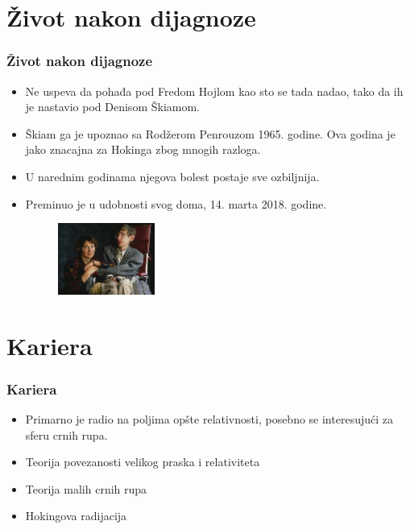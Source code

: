 \documentclass{beamer}
\begin{document}
\section{Život nakon dijagnoze}

\begin{frame}[fragile]\frametitle{Život nakon dijagnoze}
	\begin{itemize} \fontsize{9}{6}\selectfont	
		\item  Ne uspeva da pohađa pod Fredom Hojlom kao sto se tada nadao, tako da ih je nastavio pod Denisom Škiamom. 
            \item Škiam ga je upoznao sa Rodžerom Penrouzom 1965. godine. Ova godina je jako znacajna za Hokinga zbog mnogih razloga.
		\item  U narednim godinama njegova bolest postaje sve ozbiljnija.
		\item  Preminuo je u udobnosti svog doma, 14. marta 2018. godine.
\begin{figure}[h!] 
\begin{center}
\includegraphics[width=0.3\textwidth]{StivenHoking.jpeg}
\end{center} 
 \captionsetup{font=small}{Slika2: Stiven Hoking i njegova žena} 
\label{fig:StivenHoking}
\end{figure}
\end{itemize}
\end{frame}


\section{Kariera}

\begin{frame}[fragile]\frametitle{Kariera}
\begin{itemize}	 \fontsize{9}{6}\selectfont
		
\item  Primarno je radio na poljima opšte relativnosti, posebno se interesujući za sferu crnih rupa.
\item Teorija povezanosti velikog praska i relativiteta
\item Teorija malih crnih rupa
\item Hokingova radijacija 
\end{itemize}
\end{frame}
\end{document}
